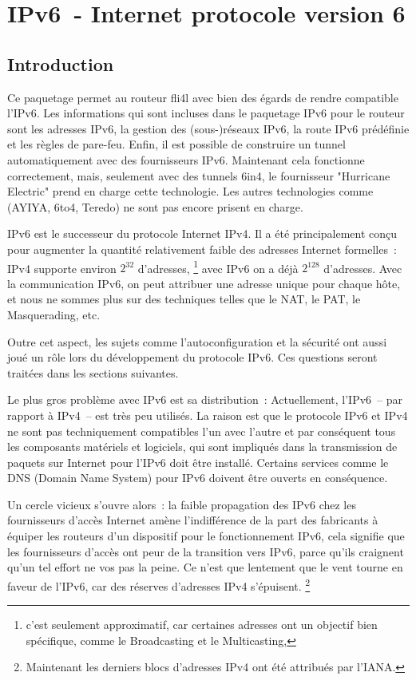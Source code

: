 
\section{IPv6~- Internet protocole version 6}

\subsection{Introduction}

Ce paquetage permet au routeur fli4l avec bien des égards de rendre compatible
l'IPv6. Les informations qui sont incluses dans le paquetage IPv6 pour le routeur
sont les adresses IPv6, la gestion des (sous-)réseaux IPv6, la route IPv6
prédéfinie et les règles de pare-feu.
Enfin, il est possible de construire un tunnel automatiquement
avec des fournisseurs IPv6. Maintenant cela fonctionne correctement, mais,
seulement avec des tunnels 6in4, le fournisseur "Hurricane Electric" prend en
charge cette technologie. Les autres technologies comme (AYIYA, 6to4, Teredo) ne
sont pas encore prisent en charge.

IPv6 est le successeur du protocole Internet IPv4. Il a été principalement conçu
pour augmenter la quantité relativement faible des adresses Internet formelles~:
IPv4 supporte environ \(2^{32}\) d'adresses, \footnote{c'est seulement approximatif,
car certaines adresses ont un objectif bien spécifique, comme le Broadcasting et
le Multicasting,} avec IPv6 on a déjà \(2^{128}\) d'adresses. Avec la communication
IPv6, on peut attribuer une adresse unique pour chaque hôte, et nous ne sommes
plus sur des techniques telles que le NAT, le PAT, le Masquerading, etc.

Outre cet aspect, les sujets comme l'autoconfiguration et la sécurité ont aussi
joué un rôle lors du développement du protocole IPv6. Ces questions seront
traitées dans les sections suivantes.

Le plus gros problème avec IPv6 est sa distribution~: Actuellement, l'IPv6~-- par
rapport à IPv4~-- est très peu utilisés. La raison est que le protocole IPv6 et
IPv4 ne sont pas techniquement compatibles l'un avec l'autre et par conséquent
tous les composants matériels et logiciels, qui sont impliqués dans la
transmission de paquets sur Internet pour l'IPv6 doit être installé. Certains
services comme le DNS (Domain Name System) pour IPv6 doivent être ouverts en
conséquence.

Un cercle vicieux s'ouvre alors~: la faible propagation des IPv6 chez les
fournisseurs d'accès Internet amène l'indifférence de la part des fabricants à
équiper les routeurs d'un dispositif pour le fonctionnement IPv6, cela signifie
que les fournisseurs d'accès ont peur de la transition vers IPv6, parce qu'ils
craignent qu'un tel effort ne vos pas la peine. Ce n'est que lentement que le
vent tourne en faveur de l'IPv6, car des réserves d'adresses IPv4 s'épuisent.
\footnote{Maintenant les derniers blocs d'adresses IPv4 ont été attribués par
l'IANA.}

